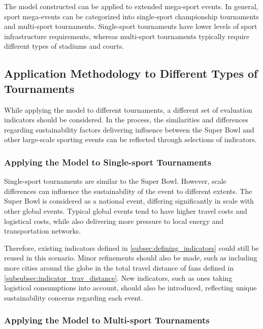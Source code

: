 \documentclass{mcmthesis}
\begin{document}
The model constructed can be applied to extended mega-sport events. In general, sport mega-events can be categorized into single-sport championship tournaments and multi-sport tournaments. Single-sport tournaments have lower levels of sport infrastructure requirements, whereas multi-sport tournaments typically require different types of stadiums and courts. 

\subsection{Application Methodology to Different Types of Tournaments} \label{subsec:tournament_types}

While applying the model to different tournaments, a different set of evaluation indicators should be considered. In the process, the similarities and differences regarding sustainability factors delivering influence between the Super Bowl and other large-scale sporting events can be reflected through selections of indicators. 

\subsubsection{Applying the Model to Single-sport Tournaments} \label{subsubsec:tournament_types_single}

Single-sport tournaments are similar to the Super Bowl. However, scale differences can influence the sustainability of the event to different extents. The Super Bowl is considered as a national event, differing significantly in scale with other global events. Typical global events tend to have higher travel costs and logistical costs, while also delivering more pressure to local energy and transportation networks. 

Therefore, existing indicators defined in \cref{subsec:defining_indicators} could still be reused in this scenario. Minor refinements should also be made, such as including more cities around the globe in the total travel distance of fans defined in \cref{subsubsec:indicator_trav_distance}. New indicators, such as ones taking logistical consumptions into account, should also be introduced, reflecting unique sustainability concerns regarding each event. 

\subsubsection{Applying the Model to Multi-sport Tournaments} \label{subsubsec:tournament_types_multi}
\end{document}
